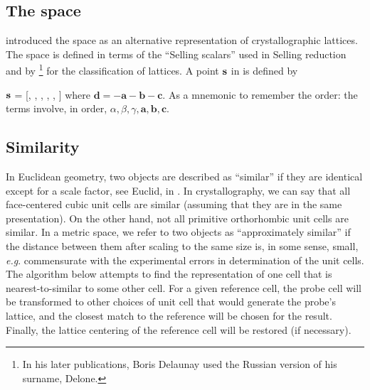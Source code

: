 \documentclass[preprint]{iucr}              %
\numberwithin{equation}{section}
\numberwithin{equation}{section}
\begin{document}
	\subsection{The space \SVI{}}
	 introduced the space \SVI{} as an alternative
	representation of crystallographic lattices. The space is defined in terms of the
	``Selling scalars'' used in Selling reduction \cite{Selling1874} and by %
		\footnote{In his later publications, Boris Delaunay used the Russian version of his surname, Delone.}
	for the classification of lattices. A point $\bf{s}$ in \SVI{} is defined by 
	
	$\bf{s}$  = [, , , , , ]
	where
	${\mathbf d} = -{\mathbf a} - {\mathbf b} - {\mathbf c}$.
	As a mnemonic to remember the order: the terms involve, in order, $ \alpha, \beta,
	\gamma, \mathbf{a}, \mathbf{b}, \mathbf{c}$.
	
	
	\subsection{Similarity}
	
In Euclidean geometry, two objects are described as ``similar'' if they are identical except for a scale factor, see Euclid, in \cite{heath1956thirteen}.
	In crystallography, we can say that all face-centered cubic unit cells are similar (assuming
	that they are in the same presentation). On the other hand, not all primitive orthorhombic 
	unit cells are similar.  In a metric space, we
	refer to two objects as ``approximately similar'' if the distance between them after scaling
	to the same size is, in some sense, small, {\it e.g}. commensurate with the experimental errors
	in determination of the unit cells.  The algorithm below attempts to find the representation of one 
	cell that is nearest-to-similar to some other cell. For a given reference cell, the probe cell
	will be transformed to other choices of unit cell that would generate the probe's lattice, and the
	closest match to the reference will be chosen for the result. Finally, the lattice centering
	of the reference cell will be restored (if necessary).
	
\end{document}
